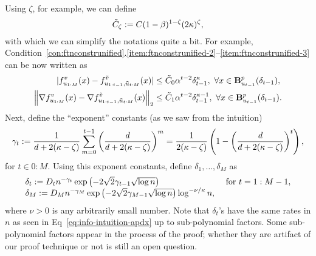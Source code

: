 Using $\zeta$, for example, we can define
\begin{equation}
\label{eq:deftildeC}
\tilde C_\zeta := C(1-\beta)^{1-\zeta}(2\kappa)^\zeta,
\end{equation}
with which we can simplify the notations quite a bit. For example, Condition~\ref{con:ftnconstrunified}.\ref{item:ftnconstrunified-2}--\ref{item:ftnconstrunified-3} can be now written as
\begin{align*}
	| f_{u_{1:M}}^v(x) - f_{u_{1:t-1}, \tilde u_{t:M}}^{\tilde v}(x) | &\leq \tilde C_0 \alpha^{t-2} \delta_{t-1}^\kappa,~\forall x \in \mathbf{B}^p_{u_{t-1}}({\delta_{t-1}}),\\
	\left\|{\nabla f_{u_{1:M}}^v(x) - \nabla f_{u_{1:t-1}, \tilde u_{t:M}}^{\tilde v}(x)}\right\|_2 &\leq \tilde C_1 \alpha^{t-2} \delta_{t-1}^{\kappa-1},~\forall x \in \mathbf{B}^p_{u_{t-1}}({\delta_{t-1}}).
\end{align*}
Next, define the ``exponent'' constants (as we saw from the intuition)
\begin{equation}
\label{eq:defgammat}
\gamma_t := \frac{1}{d+2(\kappa-\zeta)} \sum_{m=0}^{t-1} \left(\frac{d}{d+2(\kappa-\zeta)}\right)^m
= 
\frac{1}{2(\kappa-\zeta)} \left(1 - \left( \frac{d}{d+2(\kappa-\zeta)} \right)^t\right),
\end{equation}
for $t \in 0:M$. %
Using this exponent constants, define $\delta_1, \dots, \delta_M$ as
\begin{equation}
\label{eq:defdeltat}
\begin{array}{ll}
\delta_t := 
D_t n^{ - \gamma_t } \exp \left( -2 \sqrt{2} \gamma_{t-1} \sqrt{\log n} \right) & \text{ for } t = 1:M-1,\\
\delta_M := 
D_M n^{ -\gamma_M } \exp \left( -2 \sqrt{2} \gamma_{M-1} \sqrt{\log n} \right) \log^{-\nu/\kappa} n,
\end{array}
\end{equation}
where $\nu > 0$ is any arbitrarily small number.
Note that $\delta_t$'s have the same rates in $n$ as seen in Eq~\eqref{eq:info-intuition-apdx} up to sub-polynomial factors.
Some sub-polynomial factors appear in the process of the proof; whether they are artifact of our proof technique or not is still an open question.

